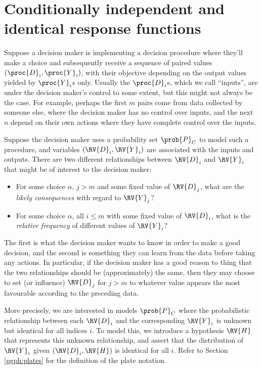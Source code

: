 \section[Response functions]{Conditionally independent and identical response functions}\label{sec:response_functions}

Suppose a decision maker is implementing a decision procedure where they'll make a choice and subsequently receive a sequence of paired values $(\proc{D}_i,\proc{Y}_i)$, with their objective depending on the output values yielded by $\proc{Y}_i$s only. Usually the $\proc{D}_i$s, which we call ``inputs'', are under the decision maker's control to some extent, but this might not always be the case. For example, perhaps the first $m$ pairs come from data collected by someone else, where the decision maker has no control over inputs, and the next $n$ depend on their own actions where they have complete control over the inputs.

Suppose the decision maker uses a probability set $\prob{P}_C$ to model such a procedure, and variables $(\RV{D}_i,\RV{Y}_i)$ are associated with the inputs and outputs. There are two different relationships between $\RV{D}_i$ and $\RV{Y}_i$ that might be of interest to the decision maker:
\begin{itemize}
    \item For some choice $\alpha$, $j>m$ and some fixed value of $\RV{D}_j$, what are the \emph{likely consequences} with regard to $\RV{Y}_j$?
    \item For some choice $\alpha$, all $i\leq m$ with some fixed value of $\RV{D}_i$, what is the \emph{relative frequency} of different values of $\RV{Y}_i$?
\end{itemize}
The first is what the decision maker wants to know in order to make a good decision, and the second is something they can learn from the data before taking any actions. In particular, if the decision maker has a good reason to thing that the two relationships should be (approximately) the same, then they may choose to set (or influence) $\RV{D}_j$ for $j>m$ to whatever value appears the most favourable according to the preceding data.

More precisely, we are interested in models $\prob{P}_C$ where the probabilistic relationship between each $\RV{D}_i$ and the corresponding $\RV{Y}_i$ is unknown but identical for all indices $i$. To model this, we introduce a hypothesis $\RV{H}$ that represents this unknown relationship, and assert that the distribution of $\RV{Y}_i$ given $(\RV{D}_i,\RV{H})$ is identical for all $i$. Refer to Section \ref{pgph:plates} for the definition of the plate notation.

